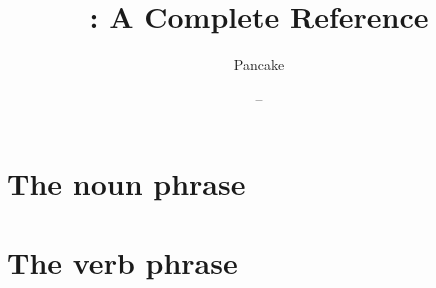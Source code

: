 \documentclass[12pt, a4paper, english]{pancake-book}
\begin{document}
\title{\langname : A Complete Reference}
\author{Pancake}
\date{ -- \DTMtoday}
\frontmatter

\maketitle
\tableofcontents

\printglossaries
\mainmatter


\chapter{The noun phrase}

\filbreak





\chapter{The verb phrase}


\end{document}
